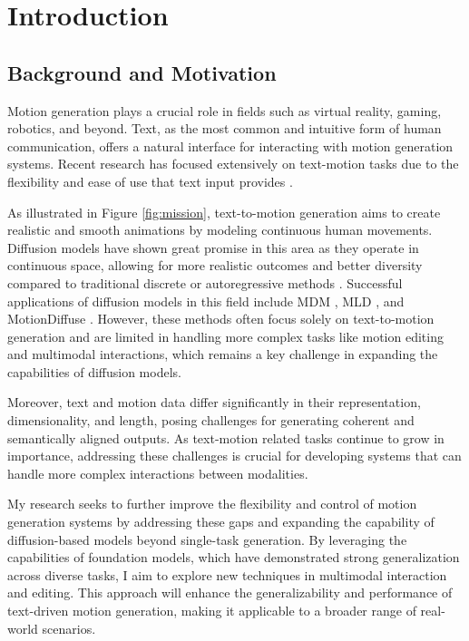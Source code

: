 \documentclass[a4paper, 12pt]{article}
\begin{document}
\section{Introduction}
\subsection{Background and Motivation}
Motion generation plays a crucial role in fields such as virtual reality, gaming, robotics, and beyond. Text, as the most common and intuitive form of human communication, offers a natural interface for interacting with motion generation systems. Recent research has focused extensively on text-motion tasks due to the flexibility and ease of use that text input provides \cite{ahuja2019language2pose,petrovich2022temos,kim2023flame,tevet2022human}.

As illustrated in Figure \ref{fig:mission}, text-to-motion generation aims to create realistic and smooth animations by modeling continuous human movements. Diffusion models have shown great promise in this area as they operate in continuous space, allowing for more realistic outcomes and better diversity compared to traditional discrete or autoregressive methods \cite{sohl2015deep,kong2020diffwave,ho2022imagen,saharia2022palette,ho2022video,aliakbarian2020stochastic}. Successful applications of diffusion models in this field include MDM \cite{tevet2022human}, MLD \cite{chen2023executing}, and MotionDiffuse \cite{zhang2024motiondiffuse}. However, these methods often focus solely on text-to-motion generation and are limited in handling more complex tasks like motion editing and multimodal interactions, which remains a key challenge in expanding the capabilities of diffusion models.

Moreover, text and motion data differ significantly in their representation, dimensionality, and length, posing challenges for generating coherent and semantically aligned outputs. As text-motion related tasks continue to grow in importance, addressing these challenges is crucial for developing systems that can handle more complex interactions between modalities.

My research seeks to further improve the flexibility and control of motion generation systems by addressing these gaps and expanding the capability of diffusion-based models beyond single-task generation. By leveraging the capabilities of foundation models, which have demonstrated strong generalization across diverse tasks, I aim to explore new techniques in multimodal interaction and editing. This approach will enhance the generalizability and performance of text-driven motion generation, making it applicable to a broader range of real-world scenarios.
\end{document}
